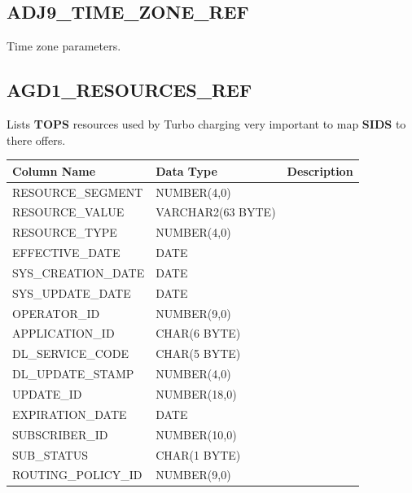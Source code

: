 \documentclass[12pt,twoside]{article}
\begin{document}
\normalsize
\subsection{ADJ9\_TIME\_ZONE\_REF}
\label{sec-9-2}

   Time zone parameters.
\subsection{AGD1\_RESOURCES\_REF}
\label{sec-9-3}

   Lists \textbf{TOPS} resources used by Turbo charging very important to map \textbf{SIDS} to there offers.
\scriptsize

\begin{center}
\begin{tabular}{lll}
\hline
 \textbf{Column Name}     &  \textbf{Data Type}  &  \textbf{Description}  \\
\hline
 RESOURCE\_SEGMENT        &  NUMBER(4,0)         &                        \\
 RESOURCE\_VALUE          &  VARCHAR2(63 BYTE)   &                        \\
 RESOURCE\_TYPE           &  NUMBER(4,0)         &                        \\
 EFFECTIVE\_DATE          &  DATE                &                        \\
 SYS\_CREATION\_DATE      &  DATE                &                        \\
 SYS\_UPDATE\_DATE        &  DATE                &                        \\
 OPERATOR\_ID             &  NUMBER(9,0)         &                        \\
 APPLICATION\_ID          &  CHAR(6 BYTE)        &                        \\
 DL\_SERVICE\_CODE        &  CHAR(5 BYTE)        &                        \\
 DL\_UPDATE\_STAMP        &  NUMBER(4,0)         &                        \\
 UPDATE\_ID               &  NUMBER(18,0)        &                        \\
 EXPIRATION\_DATE         &  DATE                &                        \\
 SUBSCRIBER\_ID           &  NUMBER(10,0)        &                        \\
 SUB\_STATUS              &  CHAR(1 BYTE)        &                        \\
 ROUTING\_POLICY\_ID      &  NUMBER(9,0)         &                        \\

\end{tabular}
\end{center}
\end{document}
